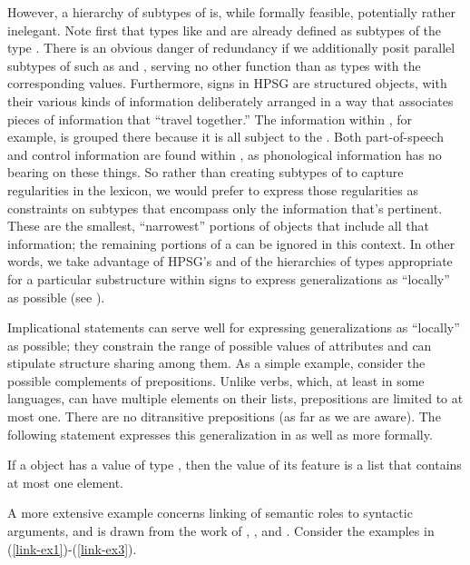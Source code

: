\documentclass[output=paper
 	        ,biblatex
                ,babelshorthands
                ,newtxmath
                ,draftmode
                ,colorlinks, citecolor=brown
]{langscibook}
\begin{document}
However, a hierarchy of subtypes of  is, while formally feasible, potentially rather inelegant.
Note first that types like  and  are already defined as subtypes of the type .
There is an obvious danger of redundancy if we additionally posit parallel subtypes of  such as  and  , serving no other function than as types with the corresponding  values.
Furthermore, signs in HPSG are structured objects, with their various kinds of information deliberately arranged in a way that associates pieces of information that ``travel together.''
The information within , for example, is grouped there because it is all subject to the .
Both part-of-speech and control information are found within , as phonological information has no bearing on these things.
So rather than creating subtypes of  to capture regularities in the lexicon, we would prefer to express those regularities as constraints on subtypes that encompass only the information that's pertinent.
These are the smallest, ``narrowest'' portions of  objects that include all that information; the remaining portions of a  can be ignored in this context.
In other words, we take advantage of HPSG's  and of the hierarchies of types appropriate for a particular substructure within signs to express generalizations as ``locally'' as possible (see ).

Implicational statements can serve well for expressing generalizations as ``locally'' as possible; they constrain the range of possible values of attributes and can stipulate structure sharing among them.
As a simple example, consider the possible complements of prepositions.
Unlike verbs, which, at least in some languages, can have multiple elements on their  lists, prepositions are limited to at most one.
There are no ditransitive prepositions (as far as we are aware).
The following statement expresses this generalization in  as well as more formally.

\ealnoraggedright
\ex If a  object has a  value of type , then the value of its  feature is a list that contains at most one element.
\ex {}
\zl

A more extensive example concerns linking of semantic roles to syntactic arguments, and is drawn from the work of \citet{DavisandKoenig2000b}, \citet{Davis2001}, and \citet{KoenigandDavis2003}. Consider the examples in (\ref{link-ex1})-(\ref{link-ex3}).
\end{document}
